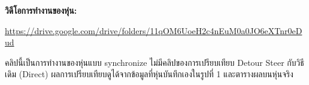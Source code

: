 \documentclass[11pt,a4paper]{article}
\begin{document}
\textbf{วิดีโอการทำงานของหุ่น:}
\begin{center}\url{https://drive.google.com/drive/folders/11qOM6UoeH2c4nEuM0a0JO6eXTnr0eDud}\end{center}
{\small คลิปนี้เป็นการทำงานของหุ่นแบบ synchronize
ไม่มีคลิปของการเปรียบเทียบ Detour Steer กับวิธีเดิม (Direct)
ผลการเปรียบเทียบดูได้จากข้อมูลที่หุ่นบันทึกเองในรูปที่ 1 และตารางผลบนหุ่นจริง}
\end{document}
